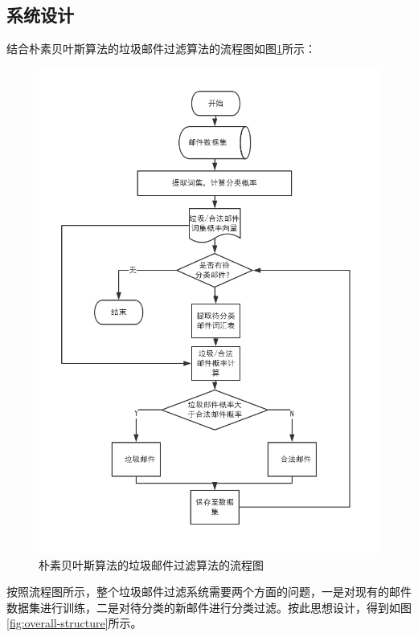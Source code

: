 \documentclass[UTF8,zihao=-4]{ctexart}
\begin{document}
\subsection{系统设计}
	结合朴素贝叶斯算法的垃圾邮件过滤算法的流程图如图\ref{fig:overall-flowchart}所示：
	
	\begin{figure}[H]
		\centering
		\includegraphics[scale=0.5]{pictures/朴素贝叶斯算法的垃圾邮件过滤算法的流程图.png}
		\caption{朴素贝叶斯算法的垃圾邮件过滤算法的流程图}
		\label{fig:overall-flowchart}
	\end{figure}

	按照流程图所示，整个垃圾邮件过滤系统需要两个方面的问题，一是对现有的邮件数据集进行训练，二是对待分类的新邮件进行分类过滤。按此思想设计，得到如图\ref{fig:overall-structure}所示。
	
\end{document}

